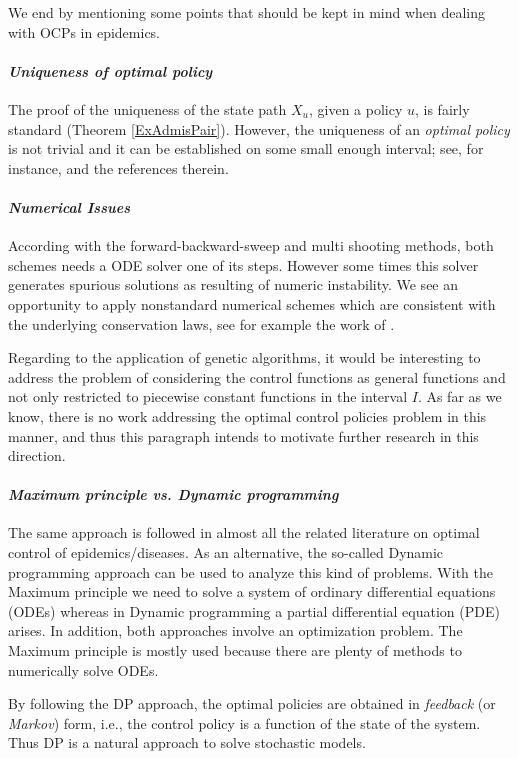 We end by mentioning some points that should be kept in mind when dealing with OCPs in epidemics.

\paragraph{\it Uniqueness of optimal policy}
The proof of the uniqueness of the state path $X_u$, given a policy $u$, is
fairly standard (Theorem \ref{ExAdmisPair}). However, the uniqueness of an 
{\it optimal policy} is not trivial and it can be established on some small 
enough interval; see, for instance, \cite{GaffSchaefer09} and the references 
therein.  
\medskip

\paragraph{\it Numerical Issues}
  According with the forward-backward-sweep and multi shooting methods, both 
schemes needs a ODE solver one of its steps. However some times this solver 
generates spurious solutions as resulting of numeric instability. We see an 
opportunity to  apply nonstandard numerical schemes which are consistent with 
the underlying conservation laws, see for example the work of 
\citet{Mickens2007a}.
  
  Regarding to the application of genetic algorithms, it would be interesting to address the problem of considering the control functions as general 
functions and not only restricted to piecewise constant functions in the 
interval $I$. As far as we know, there is no work addressing  the optimal 
control policies problem in this manner, and thus this paragraph intends to 
motivate further research in this direction.
\medskip

\paragraph{\it Maximum principle vs. Dynamic programming} 
  The same approach is followed in almost all the related literature on optimal
control of epidemics/diseases. As an alternative, the so-called Dynamic
programming approach can be used to analyze this kind of problems. With the
Maximum principle we need to solve a system of ordinary differential equations
(ODEs) whereas in Dynamic programming a partial differential equation (PDE)
arises. In addition, both approaches involve an optimization problem. The
Maximum principle is mostly used because there are plenty of methods to
numerically solve ODEs. 

By following the DP approach, the optimal policies are obtained in {\it feedback}
(or {\it Markov}) form, i.e., the control policy is a function of the state of 
the system. Thus DP is a natural approach to solve stochastic models.
